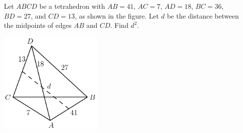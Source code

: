 Let $ABCD$ be a tetrahedron with $AB=41$, $AC=7$, $AD=18$, $BC=36$, $BD=27$, and $CD=13$, as shown in the figure. Let $d$ be the distance between the midpoints of edges $AB$ and $CD$. Find $d^{2}$.

\begin{center}
\includegraphics[width = 50.400000000000006mm]{img/fig0.png}
\end{center}